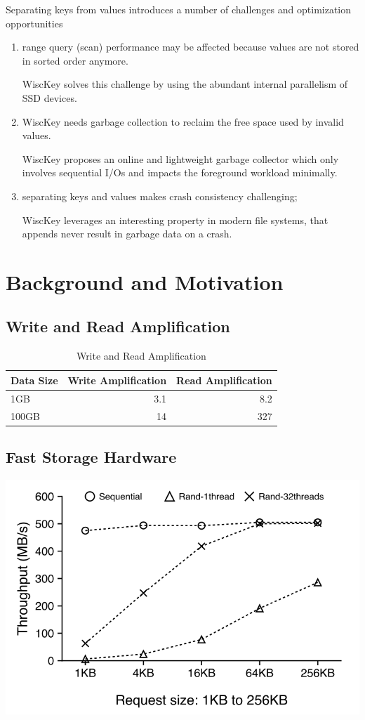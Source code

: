 \documentclass[11pt]{article}
\begin{document}
Separating keys from values introduces a number of challenges and optimization opportunities
\begin{enumerate}
\item range query (scan) performance may be affected because values are not stored in sorted order
anymore.

WiscKey solves this challenge by using the abundant internal parallelism of SSD devices.

\item WiscKey needs garbage collection to reclaim the free space used by invalid values.

WiscKey proposes an online and lightweight garbage collector which only involves sequential I/Os
and impacts the foreground workload minimally.
\item separating keys and values makes crash consistency challenging;

WiscKey leverages an interesting property in modern ﬁle systems, that appends never result in
garbage data on a crash.
\end{enumerate}
\section{Background and Motivation}
\label{sec:org71ee783}
\subsection{Write and Read Amplification}
\label{sec:orge6aae86}
\begin{table}[htbp]
\caption{Write and Read Amplification}
\centering
\begin{tabular}{lrr}
Data Size & Write Amplification & Read Amplification\\
\hline
1GB & 3.1 & 8.2\\
100GB & 14 & 327\\
\end{tabular}
\end{table}
\subsection{Fast Storage Hardware}
\label{sec:orgccc720a}
\begin{center}
\includegraphics[width=.7\textwidth]{../../images/db/15.png}
\end{center}
\end{document}
